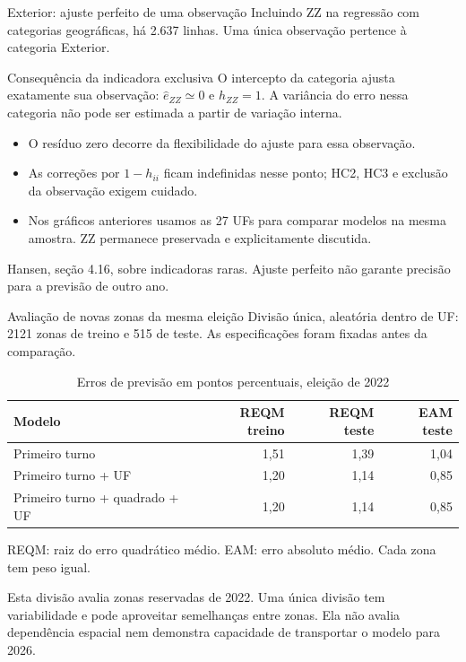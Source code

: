 \documentclass[
  ignorenonframetext,
  brazilian,
  aspectratio=169,
  10pt]{beamer}
\providecommand{\tightlist}{%
  \setlength{\itemsep}{0pt}\setlength{\parskip}{0pt}}
\begin{document}
\begin{frame}{Exterior: ajuste perfeito de uma observação}
\protect{}\label{exterior-ajuste-perfeito-de-uma-observauxe7uxe3o}
Incluindo ZZ na regressão com categorias geográficas, há 2.637 linhas.
Uma única observação pertence à categoria Exterior.

\begin{block}{Consequência da indicadora exclusiva}
O intercepto da categoria ajusta exatamente sua observação:
$\hat e_{ZZ}\simeq0$ e $h_{ZZ}=1$.
A variância do erro nessa categoria não pode ser estimada a partir de variação interna.
\end{block}

\begin{itemize}
\tightlist
\item
  O resíduo zero decorre da flexibilidade do ajuste para essa
  observação.
\item
  As correções por \(1-h_{ii}\) ficam indefinidas nesse ponto; HC2, HC3
  e exclusão da observação exigem cuidado.
\item
  Nos gráficos anteriores usamos as 27 UFs para comparar modelos na
  mesma amostra. ZZ permanece preservada e explicitamente discutida.
\end{itemize}

\scriptsize Hansen, seção 4.16, sobre indicadoras raras. Ajuste perfeito
não garante precisão para a previsão de outro ano.
\end{frame}

\begin{frame}{Avaliação de novas zonas da mesma eleição}
\protect{}\label{avaliauxe7uxe3o-de-novas-zonas-da-mesma-eleiuxe7uxe3o}
Divisão única, aleatória dentro de UF: 2121 zonas de treino e 515 de
teste. As especificações foram fixadas antes da comparação.

\small
\begin{table}

\caption{\label{tab:tabela-previsao}Erros de previsão em pontos percentuais, eleição de 2022}
\centering
\begin{tabular}[t]{lrrr}
\toprule
Modelo & REQM treino & REQM teste & EAM teste\\
\midrule
Primeiro turno & 1,51 & 1,39 & 1,04\\
Primeiro turno + UF & 1,20 & 1,14 & 0,85\\
Primeiro turno + quadrado + UF & 1,20 & 1,14 & 0,85\\
\bottomrule
\end{tabular}
\end{table}

REQM: raiz do erro quadrático médio. EAM: erro absoluto médio. Cada zona
tem peso igual.

Esta divisão avalia zonas reservadas de 2022. Uma única divisão tem
variabilidade e pode aproveitar semelhanças entre zonas. Ela não avalia
dependência espacial nem demonstra capacidade de transportar o modelo
para 2026.
\end{frame}
\end{document}
